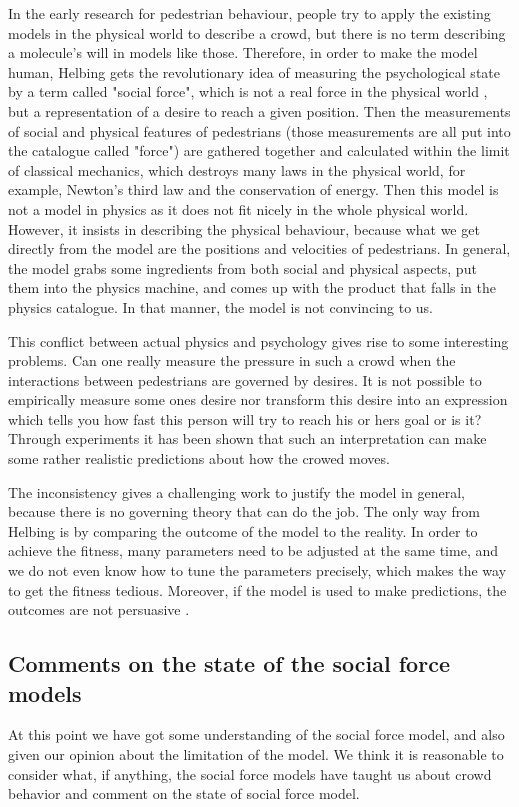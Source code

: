 In the early research for pedestrian behaviour, people try to apply the existing models in the physical world to describe a crowd, but there is no term describing 
a molecule's will in models like those. Therefore, in order to make the model human, Helbing gets the revolutionary idea of measuring the psychological state 
by a term called "social force", which is not a real force in the physical world \cite{social-force}, but a representation of a desire to reach a given position. Then the measurements of social and physical features of pedestrians (those measurements are all put into the catalogue called "force") are gathered together and calculated within the limit of classical mechanics, which destroys many laws in the physical world, for example, Newton's third law and the conservation of energy. Then this model is not a model in physics as it does not fit nicely in the whole physical world. However, it insists in describing the physical behaviour, because what we get directly from the model are the positions and velocities of pedestrians. In general, the model grabs some ingredients from both social and physical aspects, put them into the physics machine, and comes up with the product that falls in the physics catalogue. In that manner, the model is not convincing to us.

This conflict between actual physics and psychology gives rise to some interesting problems. Can one really measure the pressure in such a crowd when the interactions between pedestrians are governed by desires. It is not possible to empirically measure some ones desire nor transform this desire into an expression which tells you how fast this person will try to reach his or hers goal or is it?
Through experiments it has been shown that such an interpretation can make some rather realistic predictions about how the crowed moves.

The inconsistency gives a challenging work to justify the model in general, because there is no governing theory that can do the job. The only way from Helbing 
is by comparing the outcome of the model to the reality. In order to achieve the fitness, many parameters need to be adjusted at the same time, and we do not even know how to tune the parameters precisely, which makes the way to get the fitness tedious. Moreover, if the model is used to make predictions, the
outcomes are not persuasive . 

\subsection{Comments on the state of the social force models}
At this point we have got some understanding of the social force model, and 
also given our opinion about the limitation of the model. We think it is 
reasonable to consider what, if anything, the social force models have taught 
us about crowd behavior and comment on the state of social force model. 

